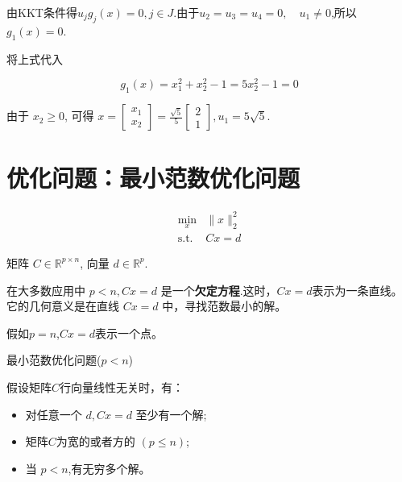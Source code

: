 由KKT条件得$ u_{j} g_{j}(x)=0, j \in J $.由于$ u_{2}=u_{3}=u_{4}=0, \quad u_{1} \neq 0 $,所以$g_1(x) = 0$.


将上式代入

\begin{equation}g_{1}(x)=x_{1}^{2}+x_{2}^{2}-1=5 x_{2}^{2}-1=0\end{equation}


由于 $ x_{2} \geq 0 $, 可得 $x = \left[\begin{array}{l}x_{1} \\ x_{2}\end{array}\right]=\frac{\sqrt{5}}{5}\left[\begin{array}{l}2 \\ 1\end{array}\right], u_{1}=5 \sqrt{5} $.

\section{优化问题：最小范数优化问题}

\begin{problem}

\begin{equation}\begin{aligned}
    \min _{x} &\|x\|_{2}^{2}\\
   \text{s.t.} &C x=d 
\end{aligned}\end{equation}

矩阵 $C \in \mathbb{R}^{p \times n} $, 向量 $ d \in \mathbb{R}^{p} $.
\end{problem}


在大多数应用中 $ p<n,  C x=d $ 是一个\textbf{欠定方程}.这时，$C x=d$表示为一条直线。它的几何意义是在直线 $ C x=d $ 中，寻找范数最小的解。

假如$p = n$,$C x=d$表示一个点。

\begin{FigureCenter}{最小范数优化问题($p < n$)}
    
\end{FigureCenter}



假设矩阵$C$行向量线性无关时，有：
\begin{itemize}
    \item 对任意一个 $ {d}, C x=d $ 至少有一个解;
    \item 矩阵$C$为宽的或者方的 $ (p \leq n) $;
    \item 当 $ p<n $,有无穷多个解。
\end{itemize}

